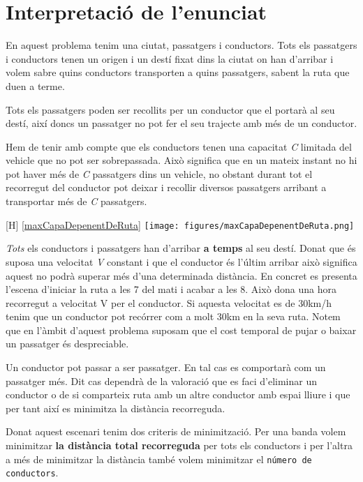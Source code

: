 \section{Interpretació de l'enunciat}

En aquest problema tenim una ciutat, passatgers i conductors. Tots els passatgers i conductors
tenen un origen i un destí fixat dins la ciutat on han d'arribar i volem sabre quins conductors
transporten a quins passatgers, sabent la ruta que duen a terme.

Tots els passatgers poden ser recollits per un conductor que el portarà al seu destí,
així doncs un passatger no pot fer el seu trajecte amb més de un conductor.

Hem de tenir amb compte que els conductors tenen una capacitat \emph{C} limitada del vehicle que no pot ser
sobrepassada. Això significa que en un mateix instant no hi pot haver més de \emph{C} passatgers dins un vehicle,
no obstant durant tot el recorregut del conductor pot deixar i recollir diversos passatgers arribant a transportar
més de \emph{C} passatgers\cite{maxCapaDepenentDeRuta}.

\begin{center}[H] \ref{maxCapaDepenentDeRuta}
 \texttt{[image: figures/maxCapaDepenentDeRuta.png]}
\end{center}


\emph{Tots} els conductors i passatgers han d'arribar \textbf{a temps} al seu destí. Donat que és
suposa una velocitat \emph{V} constant i que el conductor és l'últim arribar això significa aquest no podrà
superar més d'una determinada distància. En concret es presenta l'escena d'iniciar la ruta a les 7 del mati
i acabar a les 8. Això dona una hora recorregut a velocitat V per el conductor. Si aquesta velocitat es
de 30km/h tenim que un conductor pot recórrer com a molt 30km en la seva ruta. Notem que en l'àmbit
d'aquest problema suposam que el cost temporal de pujar o baixar un passatger és despreciable.

Un conductor pot passar a ser passatger. En tal cas es comportarà com un passatger més. Dit cas
dependrà de la valoració que es faci d'eliminar un conductor o de si comparteix ruta amb un altre
conductor amb espai lliure i que per tant així es minimitza la distància recorreguda.

Donat aquest escenari tenim dos criteris de minimització.
Per una banda volem minimitzar \textbf{la distància total recorreguda} per tots els conductors i per l'altra
a més de minimitzar la distància també volem minimitzar el \texttt{número de conductors}.

